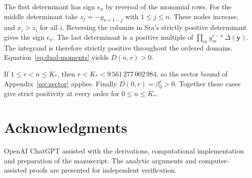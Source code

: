 \documentclass[11pt,a4paper,reqno]{amsart}
\numberwithin{equation}{section}
\begin{document}
The first determinant has sign \(\epsilon_n\) by reversal of the monomial rows. For the middle determinant take \(z_j=-y_{n+1-j}\) with \(1\le j\le n\). These nodes increase, and \(x_i>z_i\) for all \(i\). Reversing the columns in Sra's strictly positive determinant gives the sign \(\epsilon_n\). The last determinant is a positive multiple of \(\prod_m y_m^{r-n}\,\Delta(\mathbf y)\). The integrand is therefore strictly positive throughout the ordered domains. Equation~\eqref{eq:dual-moments} yields \(D(n,r)>0\).

If \(1\le r<n\le K_*\), then \(r<K_*<9\,561\,277\,002\,984\), so the sector bound of Appendix~\ref{sec:sector} applies. Finally \(D(0,r)=\beta_0^r>0\). Together these cases give strict positivity at every order for \(0\le n\le K_*\).

\section*{Acknowledgments} OpenAI ChatGPT assisted with the derivations, computational implementation and preparation of the manuscript. The analytic arguments and computer-assisted proofs are presented for independent verification.
\end{document}
